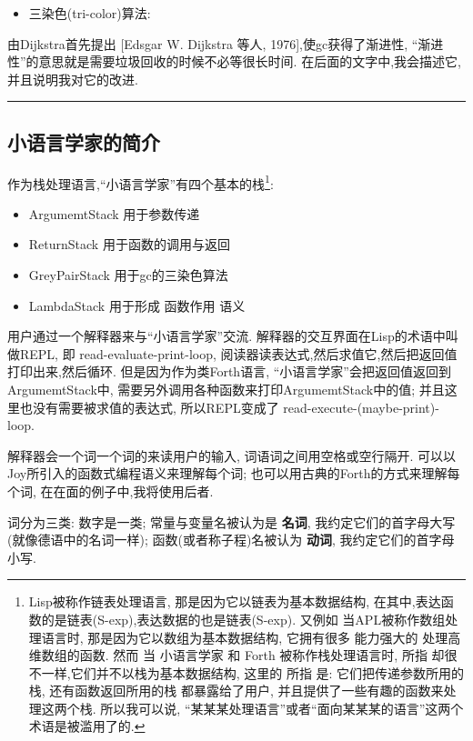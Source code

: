 \documentclass[a4paper]{article}
\begin{document}
\begin{itemize}
\item 三染色(tri-color)算法:
\end{itemize}

由Dijkstra首先提出 [Edsgar W. Dijkstra 等人, 1976],使gc获得了渐进性,
``渐进性''的意思就是需要垃圾回收的时候不必等很长时间.
在后面的文字中,我会描述它,并且说明我对它的改进.

\vspace{.5cm}\hrule\vspace{.5cm}


\subsection{小语言学家的简介}

作为栈处理语言,``小语言学家''有四个基本的栈\footnote{Lisp被称作链表处理语言,
那是因为它以链表为基本数据结构,
在其中,表达函数的是链表(S-exp),表达数据的也是链表(S-exp).
又例如 当APL被称作数组处理语言时,
那是因为它以数组为基本数据结构,
它拥有很多 能力强大的 处理高维数组的函数.
然而 当 小语言学家 和 Forth 被称作栈处理语言时,
所指 却很不一样,它们并不以栈为基本数据结构,
这里的 所指 是:
它们把传递参数所用的栈,
还有函数返回所用的栈 都暴露给了用户,
并且提供了一些有趣的函数来处理这两个栈.
所以我可以说,
``某某某处理语言''或者``面向某某某的语言''这两个术语是被滥用了的.}:

\begin{itemize}
\item ArgumemtStack 用于参数传递
\item ReturnStack 用于函数的调用与返回
\item GreyPairStack 用于gc的三染色算法
\item LambdaStack 用于形成 函数作用 语义
\end{itemize}

用户通过一个解释器来与``小语言学家''交流.
解释器的交互界面在Lisp的术语中叫做REPL,
即 read-evaluate-print-loop,
阅读器读表达式,然后求值它,然后把返回值打印出来,然后循环.
但是因为作为类Forth语言,
``小语言学家''会把返回值返回到ArgumemtStack中,
需要另外调用各种函数来打印ArgumemtStack中的值;
并且这里也没有需要被求值的表达式,
所以REPL变成了 read-execute-(maybe-print)-loop.

解释器会一个词一个词的来读用户的输入,
词语词之间用空格或空行隔开.
可以以Joy所引入的函数式编程语义来理解每个词;
也可以用古典的Forth的方式来理解每个词,
在在面的例子中,我将使用后者.

词分为三类:
数字是一类;
常量与变量名被认为是 \textbf{名词},
我约定它们的首字母大写(就像德语中的名词一样);
函数(或者称子程)名被认为 \textbf{动词},
我约定它们的首字母小写.
\end{document}
